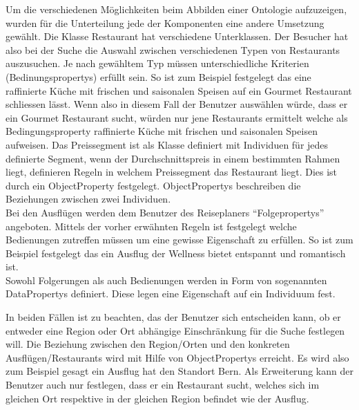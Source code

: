 Um die verschiedenen Möglichkeiten beim Abbilden einer Ontologie aufzuzeigen, wurden für die Unterteilung jede der Komponenten eine andere Umsetzung gewählt. Die Klasse Restaurant hat verschiedene Unterklassen. Der Besucher hat also bei der Suche die Auswahl zwischen verschiedenen Typen von Restaurants auszusuchen. Je nach gewähltem Typ müssen unterschiedliche Kriterien (Bedinungspropertys) erfüllt sein. So ist zum Beispiel festgelegt das eine raffinierte Küche mit frischen und saisonalen Speisen auf ein Gourmet Restaurant schliessen lässt. Wenn also in diesem Fall der Benutzer auswählen würde, dass er ein Gourmet Restaurant sucht, würden nur jene Restaurants ermittelt welche als Bedingungsproperty raffinierte Küche mit frischen und saisonalen Speisen aufweisen.  Das Preissegment ist als Klasse definiert mit Individuen für jedes definierte Segment, wenn der Durchschnittspreis in einem bestimmten Rahmen liegt, definieren Regeln in welchem Preissegment das Restaurant liegt.  Dies ist durch ein ObjectProperty festgelegt. ObjectPropertys beschreiben die Beziehungen zwischen zwei Individuen.\\ 
Bei den Ausflügen werden dem Benutzer des Reiseplaners "`Folgepropertys"' angeboten. Mittels der vorher erwähnten Regeln ist festgelegt welche Bedienungen zutreffen müssen um eine gewisse Eigenschaft zu erfüllen. So ist zum Beispiel festgelegt das ein Ausflug der Wellness bietet entspannt und romantisch ist.\\ Sowohl Folgerungen als auch Bedienungen werden in Form von sogenannten DataPropertys definiert. Diese legen eine Eigenschaft auf ein Individuum fest.

In beiden Fällen ist zu beachten, das der Benutzer sich entscheiden kann, ob er entweder eine Region oder Ort abhängige Einschränkung für die Suche festlegen will. Die Beziehung zwischen den Region/Orten und den konkreten Ausflügen/Restaurants wird mit Hilfe von ObjectPropertys erreicht. Es wird also zum Beispiel gesagt ein Ausflug hat den Standort Bern. Als Erweiterung kann der Benutzer auch nur festlegen, dass er ein Restaurant sucht, welches sich im gleichen Ort respektive in der gleichen Region befindet wie der Ausflug.


